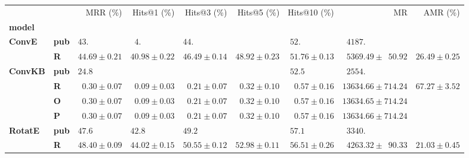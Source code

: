 \begin{tabular}{llrrrrrrr}
\toprule
       &   &                    MRR (\%) &                           Hits@1 (\%) &                 Hits@3 (\%) &                 Hits@5 (\%) &                Hits@10 (\%) &                                         MR &          AMR (\%) \\
\textbf{model} & {} &                             &                                       &                             &                             &                             &                                            &                   \\
\midrule
\textbf{ConvE} & \textbf{pub} &  $43.\phantom{00 \pm 0.00}$ &  $\phantom{0}4.\phantom{00 \pm 0.00}$ &  $44.\phantom{00 \pm 0.00}$ &                             &  $52.\phantom{00 \pm 0.00}$ &  $\phantom{0}4187.\phantom{00 \pm 000.00}$ &                   \\
       & \textbf{R} &            $44.69 \pm 0.21$ &                      $40.98 \pm 0.22$ &            $46.49 \pm 0.14$ &            $48.92 \pm 0.23$ &            $51.76 \pm 0.13$ &  $\phantom{0}5369.49 \pm \phantom{0}50.92$ &  $26.49 \pm 0.25$ \\\midrule
\textbf{ConvKB} & \textbf{pub} &  $24.8\phantom{0 \pm 0.00}$ &                                       &                             &                             &  $52.5\phantom{0 \pm 0.00}$ &  $\phantom{0}2554.\phantom{00 \pm 000.00}$ &                   \\
       & \textbf{R} &  $\phantom{0}0.30 \pm 0.07$ &            $\phantom{0}0.09 \pm 0.03$ &  $\phantom{0}0.21 \pm 0.07$ &  $\phantom{0}0.32 \pm 0.10$ &  $\phantom{0}0.57 \pm 0.16$ &                      $13634.66 \pm 714.24$ &  $67.27 \pm 3.52$ \\
       & \textbf{O} &  $\phantom{0}0.30 \pm 0.07$ &            $\phantom{0}0.09 \pm 0.03$ &  $\phantom{0}0.21 \pm 0.07$ &  $\phantom{0}0.32 \pm 0.10$ &  $\phantom{0}0.57 \pm 0.16$ &                      $13634.65 \pm 714.24$ &                   \\
       & \textbf{P} &  $\phantom{0}0.30 \pm 0.07$ &            $\phantom{0}0.09 \pm 0.03$ &  $\phantom{0}0.21 \pm 0.07$ &  $\phantom{0}0.32 \pm 0.10$ &  $\phantom{0}0.57 \pm 0.16$ &                      $13634.66 \pm 714.24$ &                   \\\midrule
\textbf{RotatE} & \textbf{pub} &  $47.6\phantom{0 \pm 0.00}$ &            $42.8\phantom{0 \pm 0.00}$ &  $49.2\phantom{0 \pm 0.00}$ &                             &  $57.1\phantom{0 \pm 0.00}$ &  $\phantom{0}3340.\phantom{00 \pm 000.00}$ &                   \\
       & \textbf{R} &            $48.40 \pm 0.09$ &                      $44.02 \pm 0.15$ &            $50.55 \pm 0.12$ &            $52.98 \pm 0.11$ &            $56.51 \pm 0.26$ &  $\phantom{0}4263.32 \pm \phantom{0}90.33$ &  $21.03 \pm 0.45$ \\
\bottomrule
\end{tabular}

